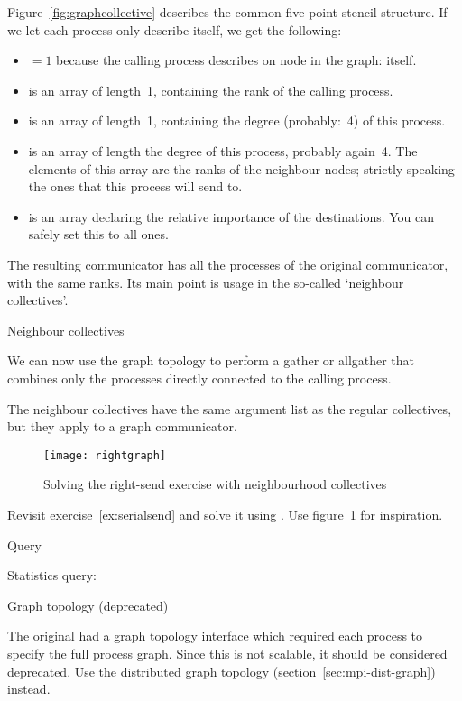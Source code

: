 
Figure~\ref{fig:graphcollective} describes the common five-point
stencil structure. If we let each process only describe itself, we get
the following:
\begin{itemize}
\item {}$=1$ because the calling process describes on node
  in the graph: itself.
\item {} is an array of length~1, containing the rank of the
  calling process.
\item {} is an array of length~1, containing the degree
  (probably:~4) of this process.
\item {} is an array of length the degree of this
  process, probably again~4. The elements of this array are the ranks
  of the neighbour nodes; strictly speaking the ones that this process
  will send to.
\item {} is an array declaring the relative importance of the
  destinations. You can safely set this to all ones.
\end{itemize}

The resulting communicator has all the processes of the original
communicator, with the same ranks. Its main point is usage in the
so-called `neighbour collectives'.

 {Neighbour collectives}

We can now use the graph topology to perform a gather or allgather
that combines only the processes directly connected to the calling
process.


The neighbour collectives have the same argument list as the regular
collectives, but they apply to a graph communicator.

\begin{figure}[ht]
  \texttt{[image: rightgraph]}
  \caption{Solving the right-send exercise with neighbourhood
    collectives}
  \label{fig:rightgraph}
\end{figure}

\begin{exercise}
  \label{ex:rightgraph}
  Revisit exercise~\ref{ex:serialsend} and solve it using
  . Use figure~\ref{fig:rightgraph} for inspiration.
\end{exercise}

 {Query}

Statistics query:
%

 {Graph topology (deprecated)}
\label{sec:mpi-1-graph}

The original  had a graph topology interface
which required each process to specify the full process graph. Since
this is not scalable, it should be considered deprecated. Use the
distributed graph topology (section~\ref{sec:mpi-dist-graph}) instead.


